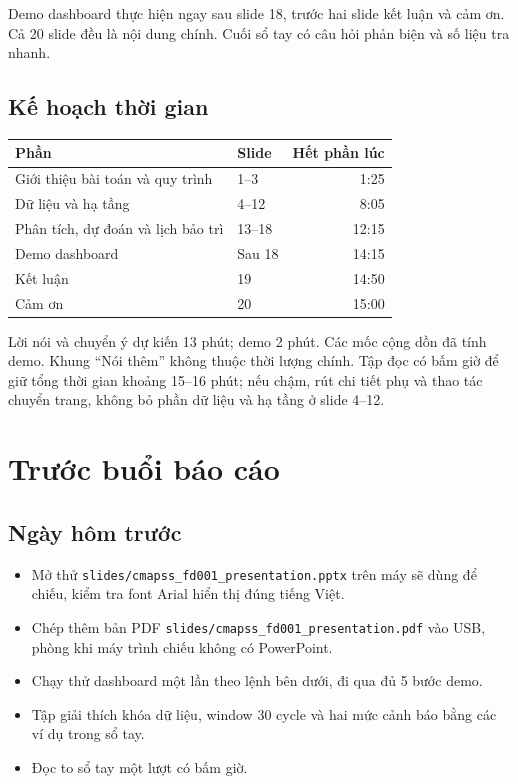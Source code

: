 \documentclass[11pt,a4paper]{article}
\newcommand{\filepath}[1]{\nolinkurl{#1}}
\begin{document}
Demo dashboard thực hiện ngay sau slide 18, trước hai slide kết luận và cảm ơn.
Cả 20 slide đều là nội dung chính. Cuối sổ tay có câu hỏi phản biện và số liệu tra nhanh.

\subsection*{Kế hoạch thời gian}
\begin{center}
\begin{tabular}{llr}
\toprule Phần & Slide & Hết phần lúc \\\midrule
Giới thiệu bài toán và quy trình & 1--3 & 1:25 \\
Dữ liệu và hạ tầng & 4--12 & 8:05 \\
Phân tích, dự đoán và lịch bảo trì & 13--18 & 12:15 \\
Demo dashboard & Sau 18 & 14:15 \\
Kết luận & 19 & 14:50 \\
Cảm ơn & 20 & 15:00 \\\bottomrule
\end{tabular}
\end{center}

Lời nói và chuyển ý dự kiến 13 phút; demo 2 phút. Các mốc cộng dồn đã tính demo.
Khung ``Nói thêm'' không thuộc thời lượng chính. Tập đọc có bấm giờ để giữ tổng
thời gian khoảng 15--16 phút; nếu chậm, rút chi tiết phụ và thao tác chuyển trang,
không bỏ phần dữ liệu và hạ tầng ở slide 4--12.
\clearpage
\section*{Trước buổi báo cáo}

\subsection*{Ngày hôm trước}
\begin{itemize}
\item Mở thử \filepath{slides/cmapss_fd001_presentation.pptx} trên máy sẽ dùng để chiếu,
      kiểm tra font Arial hiển thị đúng tiếng Việt.
\item Chép thêm bản PDF \filepath{slides/cmapss_fd001_presentation.pdf} vào USB, phòng
      khi máy trình chiếu không có PowerPoint.
\item Chạy thử dashboard một lần theo lệnh bên dưới, đi qua đủ 5 bước demo.
\item Tập giải thích khóa dữ liệu, window 30 cycle và hai mức cảnh báo bằng các ví dụ trong sổ tay.
\item Đọc to sổ tay một lượt có bấm giờ.
\end{itemize}
\end{document}
